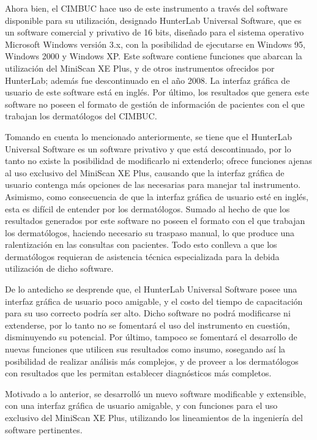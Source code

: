 Ahora bien, el CIMBUC hace uso de este instrumento a trav\'{e}s del software disponible para su utilizaci\'{o}n, designado HunterLab Universal Software, que es un software comercial y privativo de 16 bits, dise\~{n}ado para el sistema operativo Microsoft Windows versi\'{o}n 3.x, con la posibilidad de ejecutarse en Windows 95, Windows 2000 y Windows XP. Este software contiene funciones que abarcan la utilizaci\'{o}n del MiniScan XE Plus, y de otros instrumentos ofrecidos por HunterLab; adem\'{a}s fue descontinuado en el a\~{n}o 2008. La interfaz gr\'{a}fica de usuario de este software est\'{a} en ingl\'{e}s. Por \'{u}ltimo, los resultados que genera este software no poseen el formato de gesti\'{o}n de informaci\'{o}n de pacientes con el que trabajan los dermat\'{o}logos del CIMBUC.

Tomando en cuenta lo mencionado anteriormente, se tiene que el HunterLab Universal Software es un software privativo y que est\'{a} descontinuado, por lo tanto no existe la posibilidad de modificarlo ni extenderlo; ofrece funciones ajenas al uso exclusivo del MiniScan XE Plus, causando que la interfaz gr\'{a}fica de usuario contenga m\'{a}s opciones de las necesarias para manejar tal instrumento. Asimismo, como consecuencia de que la interfaz gr\'{a}fica de usuario est\'{e} en ingl\'{e}s, esta es dif\'{i}cil de entender por los dermat\'{o}logos. Sumado al hecho de que los resultados generados por este software no poseen el formato con el que trabajan los dermat\'{o}logos, haciendo necesario su traspaso manual, lo que produce una ralentizaci\'{o}n en las consultas con pacientes. Todo esto conlleva a que los dermat\'{o}logos requieran de asistencia t\'{e}cnica especializada para la debida utilizaci\'{o}n de dicho software.

De lo antedicho se desprende que, el HunterLab Universal Software posee una interfaz gr\'{a}fica de usuario poco amigable, y el costo del tiempo de capacitaci\'{o}n para su uso correcto podr\'{i}a ser alto. Dicho software no podr\'{a} modificarse ni extenderse, por lo tanto no se fomentar\'{a} el uso del instrumento en cuesti\'{o}n, disminuyendo su potencial. Por \'{u}ltimo, tampoco se fomentar\'{a} el desarrollo de nuevas funciones que utilicen sus resultados como insumo, sosegando as\'{i} la posibilidad de realizar an\'{a}lisis m\'{a}s complejos, y de proveer a los dermat\'{o}logos con resultados que les permitan establecer diagn\'{o}sticos m\'{a}s completos.

Motivado a lo anterior, se desarroll\'{o} un nuevo software modificable y extensible, con una interfaz gr\'{a}fica de usuario amigable, y con funciones para el uso exclusivo del MiniScan XE Plus, utilizando los lineamientos de la ingenier\'{i}a del software pertinentes.

